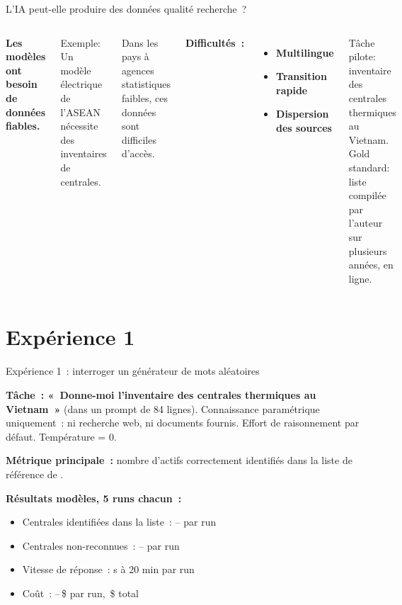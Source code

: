 \documentclass[aspectratio=169]{beamer}
\begin{document}
\begin{frame}{L'IA peut-elle produire des données qualité recherche~?}
\begin{columns}[T]
\textbf{Les modèles ont besoin de données fiables.}

\smallskip
Exemple: Un modèle électrique de l'ASEAN nécessite des inventaires de centrales.

\smallskip
Dans les pays à agences statistiques faibles, ces données sont difficiles d'accès.

\textbf{Difficultés~:}
\begin{itemize}\setlength\itemsep{1pt}
  \item \textbf{Multilingue}
  \item \textbf{Transition rapide}
  \item \textbf{Dispersion des sources}
\end{itemize}

\medskip
{\small Tâche pilote: inventaire des centrales thermiques au Vietnam.\\
Gold standard: liste compilée par l'auteur sur plusieurs années, en ligne.}
\end{columns}
\end{frame}

\section{Expérience 1}

\begin{frame}{Expérience 1~: interroger un générateur de mots aléatoires}

\smallskip
\textbf{Tâche~: «~Donne-moi l'inventaire des centrales thermiques au Vietnam~»} (dans un prompt de 84 lignes). Connaissance paramétrique uniquement~: ni recherche web, ni documents fournis. Effort de raisonnement par défaut. Température = 0.

\smallskip
\textbf{Métrique principale~:} nombre d'actifs correctement identifiés dans la liste de référence de \NumRefPlants.

\smallskip
\textbf{Résultats \NumCensusModels{} modèles, 5 runs chacun~:}
\begin{itemize}\setlength\itemsep{0pt}
  \item Centrales identifiées dans la liste~: \CensusTPMin{}--\CensusTPMax{} par run
  \item Centrales non-reconnues~: \CensusFPMin{}--\CensusFPMax{} par run
  \item Vitesse de réponse~: \CensusWallMin{} s à 20 min par run
  \item Coût~: \CensusCostMin{}--\CensusCostMax{}\,\$ par run, \CensusCostTotal{}\,\$ total
\end{itemize}
\end{frame}
\end{document}
